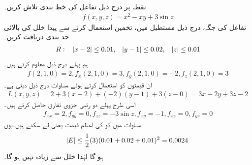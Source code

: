 نقطہ  پر درج ذیل تفاعل کی خط بندی  تلاش کریں۔
\begin{align*}
f(x,y,z)=x^2-xy+3\sin z
\end{align*}
تفاعل  کی جگہ،   درج ذیل مستطیل   میں،   تخمین  استعمال کرنے سے پیدا   خلل کی بالائی حد بندی دریافت کریں۔
\begin{align*}
R:\quad \abs{x-2}\le 0.01,\quad \abs{y-1}\le 0.02,\quad \abs{z}\le 0.01
\end{align*}
ہم   پہلے درج ذیل معلوم کرتے ہیں۔
\begin{align*}
f(2,1,0)=2, f_x(2,1,0)=3, f_y(2,1,0)=-2,f_z(2,1,0)=3
\end{align*}
ان قیمتوں کو استعمال کرتے ہوئے  مساوات  درج ذیل دیتی ہے۔
\begin{align*}
L(x,y,z)=2+3(x-2)+(-2)(y-1)+3(z-0)=3x-2y+3z-2
\end{align*}
اسی طرح پہلے دو رتبی جزوی تفارق حاصل کرتے ہیں۔
\begin{align*}
f_{xx}=2, f_{yy}=0, f_{zz}=-3\sin z, f_{xy}=-1,f_{xz}=0,f_{yz}=0
\end{align*}
مساوات  میں  کو  کی اعظم قیمت یعنی  لے سکتے ہیں۔یوں 
\begin{align*}
\abs{E}\le \frac{1}{2}(3)(0.01+0.02+0.01)^2=0.0024
\end{align*}
ہو گا لہٰذا خلل  سے زیادہ نہیں ہو گا۔
